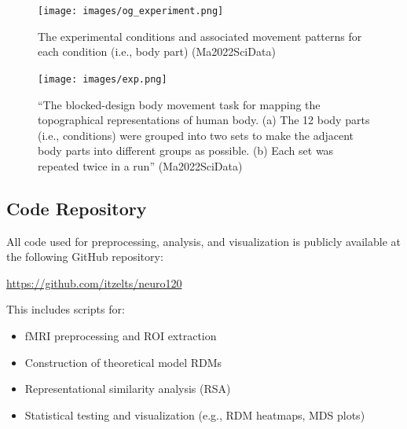 \documentclass{article}
\begin{document}
\begin{figure}[h]
    \centering
    \texttt{[image: images/og\_experiment.png]}
    \caption{The experimental conditions and associated movement patterns for each condition (i.e., body part) (Ma2022SciData)}
    \label{fig:og-exp}
\end{figure}
\begin{figure}[h]
    \centering
    \texttt{[image: images/exp.png]}
    \caption{``The blocked-design body movement task for mapping the topographical representations of human body. (a) The 12 body parts (i.e., conditions) were grouped into two sets to make the adjacent body parts into different groups as possible. (b) Each set was repeated twice in a run'' (Ma2022SciData)}
    \label{fig:exp}
\end{figure}

\subsection*{Code Repository}
All code used for preprocessing, analysis, and visualization is publicly available at the following GitHub repository:

\begin{center}
\url{https://github.com/itzelts/neuro120}
\end{center}

This includes scripts for:
\begin{itemize}
    \item fMRI preprocessing and ROI extraction
    \item Construction of theoretical model RDMs
    \item Representational similarity analysis (RSA)
    \item Statistical testing and visualization (e.g., RDM heatmaps, MDS plots)
\end{itemize}
    



   
\end{document}
